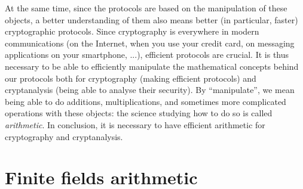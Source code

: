 At the same time, since the protocols are based on the manipulation of these
objects, a better understanding of them also means better (in particular,
faster) cryptographic protocols. Since cryptography is everywhere in modern
communications (on the Internet, when you use your credit card, on messaging
applications on your smartphone, ...), efficient protocols are crucial. It is
thus necessary to be able to efficiently manipulate the mathematical concepts
behind our protocols both for cryptography (making efficient protocols) and
cryptanalysis (being able to analyse their security). By ``manipulate'', we mean
being able to do additions, multiplications, and sometimes more complicated
operations with these objects: the science studying how to do so is called
\emph{arithmetic}. In conclusion, it is necessary to have efficient arithmetic
for cryptography and cryptanalysis.

\section{Finite fields arithmetic}

